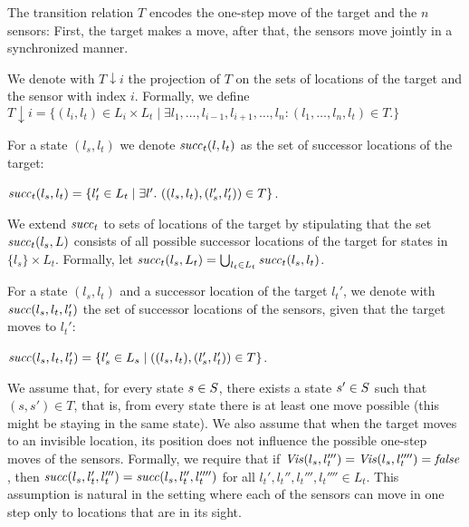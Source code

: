 The transition relation $T$ encodes the one-step move of the target and the $n$ sensors: First, the target makes a move, after that, the sensors move jointly in a synchronized manner. 

We denote with $T{\downarrow}i$ the projection of $T$ on the sets of locations of the target and the sensor with index $i$. Formally, we define
$T{\downarrow }i = \{(l_i,l_t) \in L_i \times L_t \mid \exists l_1,\ldots,l_{i-1},l_{i+1},\ldots,l_n : (l_1,\ldots,l_n,l_t) \in T.\}$

For a state $(l_s,l_t)$ we denote $\mathit{succ}_t(l,l_t)$ as the set of successor locations of the target:

$\mathit{succ}_t(l_s,l_{t}) = \{l_{t}' \in L_t \mid \exists l'.\ ((l_s,l_t),(l_s',l_t')) \in T\}$.

We extend $\mathit{succ}_t$ to sets of locations of the target by stipulating that the set $\mathit{succ}_t(l_s,L)$ consists of all possible successor locations of the target for states in $\{l_s\} \times L_t$. Formally, let $\mathit{succ}_t(l_s, L_t) = \bigcup_{l_t \in L_t}\mathit{succ}_t(l_s,l_t)$.

For a state $(l_s,l_t)$ and a successor location of the target $l_t'$, we denote with $\mathit{succ}(l_s,l_t,l_t')$ the set of successor locations of the sensors, given that the target moves to $l_t'$: 

$\mathit{succ}(l_s,l_t,l_t') = \{l_s' \in L_s \mid  ((l_s,l_t),(l_s',l_t')) \in T\}$.

We assume that, for every state $s\in S$, there exists a state $s' \in S$ such that $(s,s') \in T$, that is, from every state there is at least one move possible (this might be staying in the same state). We also assume that when the target moves to an invisible location, its position does not influence the possible one-step moves of the sensors. Formally, we require that if $\mathit{Vis}(l_s,l_t''') = \mathit{Vis}(l_s,l_t'''')=\mathit{false}$, then $\mathit{succ}(l_s,l_t',l_t''') = \mathit{succ}(l_s,l_t'',l_t'''')$ for all $l_t',l_t'',l_t''',l_t'''' \in L_t$. This assumption is natural in the setting where each of the  sensors can move in one step only to locations that are in its sight.

